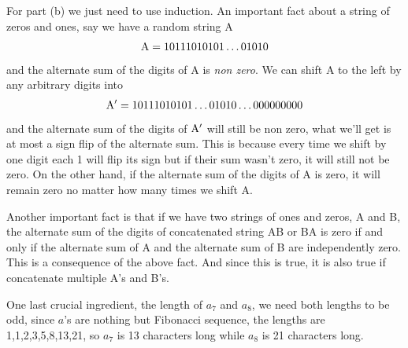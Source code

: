 \documentclass[aps,preprint,preprintnumbers,nofootinbib,showpacs,prd]{revtex4-1}
\newcommand{\nbea}{\begin{eqnarray*}}
\newcommand{\neea}{\end{eqnarray*}}
\begin{document}
For part (b) we just need to use induction. An important fact about a string of zeros and ones, say we have a random string A
%
\nbea
{\rm A} = 10111010101 \dots 01010
\neea
%
and the alternate sum of the digits of A is {\it non zero}. We can shift A to the left by any arbitrary digits into
%
\nbea
{\rm A}' = 10111010101 \dots 01010 \dots 000000000
\neea
%
and the alternate sum of the digits of ${\rm A'}$ will still be non zero, what we'll get is at most a sign flip of the alternate sum. This is because every time we shift by one digit each 1 will flip its sign but if their sum wasn't zero, it will still not be zero. On the other hand, if the alternate sum of the digits of A is zero, it will remain zero no matter how many times we shift A.

Another important fact is that if we have two strings of ones and zeros, A and B, the alternate sum of the digits of concatenated string AB or BA is zero if and only if the alternate sum of A and the alternate sum of B are independently zero. This is a consequence of the above fact. And since this is true, it is also true if concatenate multiple A's and B's.

One last crucial ingredient, the length of $a_7$ and $a_8$, we need both lengths to be odd, since $a$'s are nothing but Fibonacci sequence, the lengths are 1,1,2,3,5,8,13,21, so $a_7$ is 13 characters long while $a_8$ is 21 characters long.
\end{document}
